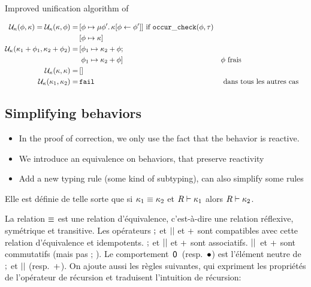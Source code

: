 \documentclass[9pt,preprint]{sigplanconf}
\begin{document}
Improved unification algorithm of 
\begin{small}
\begin{align*}
\mathcal{U}_{\kappa}(\phi, \kappa) = \mathcal{U}_{\kappa}(\kappa, \phi) =
					&\, [\phi \mapsto  \mu \phi'.\, \kappa[\phi \leftarrow \phi'] ]  \text{ if } \mathtt{occur\_check}(\phi, \tau) \\
					&\,  [\phi \mapsto \kappa] \\
\mathcal{U}_{\kappa}(\kappa_1 + \phi_1, \kappa_2 + \phi_2) =&\,
                  [\phi_1 \mapsto \kappa_2 + \phi; \\
                  &\,\; \phi_1 \mapsto \kappa_2 + \phi ] && \phi \text{ frais} \\
\mathcal{U}_{\kappa}(\kappa, \kappa) =&\, [] \\
\mathcal{U}_{\kappa}(\kappa_1, \kappa_2) =&\, \mathtt{fail}{} && \text{ dans tous les autres cas}
\end{align*}
\end{small}


\subsection{Simplifying behaviors}

\begin{itemize}
\item In the proof of correction, we only use the fact that the behavior is reactive.
\item We introduce an equivalence on behaviors, that preserve reactivity
\item Add a new typing rule (some kind of subtyping), can also simplify some rules
\end{itemize}

Elle est définie de telle sorte que si $\kappa_1 \equiv \kappa_2$ et $R \vdash \kappa_1$ alors $R \vdash \kappa_2$.

La relation $\equiv$ est une relation d'équivalence, c'est-à-dire une relation réflexive, symétrique et transitive. Les opérateurs $;$ et $ \mid\mid $ et $+$ sont compatibles avec cette relation d'équivalence et idempotents. 
$;$ et $ \mid\mid $ et $+$ sont associatifs. $ \mid\mid $~et $+$ sont commutatifs (mais pas $;\,$). Le comportement~$\textsf{0}$~(resp.~$\bullet$) est l'élément neutre de $;$ et $ \mid\mid $ (resp.~$+$). On ajoute aussi les règles suivantes, qui expriment les propriétés de l'opérateur de récursion et traduisent l'intuition de récursion:
%
\end{document}
